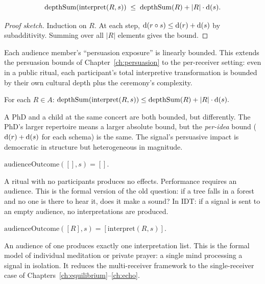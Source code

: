 \begin{theorem}
\label{thm:single-receiver-depth}
\[
  \mathrm{depthSum}(\mathrm{interpret}(R, s))
  \;\le\;
  \mathrm{depthSum}(R) + |R|\cdot\operatorname{d}(s).
\]
\end{theorem}

\begin{proof}[Proof sketch]
Induction on $R$.  At each step, $\operatorname{d}(r\circ s)\le\operatorname{d}(r)+\operatorname{d}(s)$
by subadditivity.  Summing over all $|R|$ elements gives the bound.
\end{proof}

Each audience member's ``persuasion exposure'' is linearly bounded.  This
extends the persuasion bounds of Chapter~\ref{ch:persuasion} to the
per-receiver setting: even in a public ritual, each participant's total
interpretive transformation is bounded by their own cultural depth plus the
ceremony's complexity.

\begin{theorem}
\label{thm:audience-member-depth}
For each $R\in A$:
$\mathrm{depthSum}(\mathrm{interpret}(R,s)) \le \mathrm{depthSum}(R)+|R|\cdot\operatorname{d}(s).$
\end{theorem}

A PhD and a child at the same concert are both bounded, but differently.
The PhD's larger repertoire means a larger absolute bound, but the \emph{per-idea}
bound ($\operatorname{d}(r)+\operatorname{d}(s)$ for each schema) is the same.  The signal's
persuasive impact is democratic in structure but heterogeneous in magnitude.

\begin{theorem}
\label{thm:empty-audience}
$\mathrm{audienceOutcome}([], s) = [].$
\end{theorem}

A ritual with no participants produces no effects.  Performance requires an
audience.  This is the formal version of the old question: if a tree falls
in a forest and no one is there to hear it, does it make a sound?  In IDT:
if a signal is sent to an empty audience, no interpretations are produced.

\begin{theorem}
\label{thm:singleton-audience}
$\mathrm{audienceOutcome}([R], s) = [\mathrm{interpret}(R,s)].$
\end{theorem}

An audience of one produces exactly one interpretation list.  This is the
formal model of individual meditation or private prayer: a single mind
processing a signal in isolation.  It reduces the multi-receiver framework
to the single-receiver case of Chapters~\ref{ch:equilibrium}--\ref{ch:echo}.


